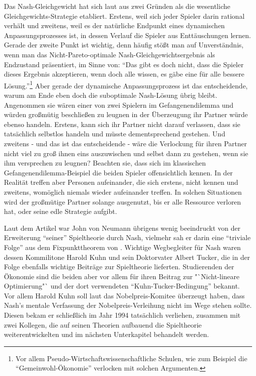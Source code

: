 Das Nash-Gleichgewicht hat sich laut \textcite[S. 61]{Holler2005} aus zwei Gründen als die wesentliche Gleichgewichts-Strategie etabliert. Erstens, weil sich jeder Spieler darin rational verhält und zweitens, weil es der natürliche Endpunkt eines dynamischen Anpassungsprozesses ist, in dessen Verlauf die Spieler aus Enttäuschungen lernen. Gerade der zweite Punkt ist wichtig, denn häufig stößt man auf Unverständnis, wenn man das Nicht-Pareto-optimale Nash-Gleichgewichtsergebnis als Endzustand präsentiert, im Sinne von: "`Das gibt es doch nicht, dass die Spieler dieses Ergebnis akzeptieren, wenn doch alle wissen, es gäbe eine für alle bessere Lösung."'\footnote{Vor allem Pseudo-Wirtschaftswissenschaftliche Schulen, wie zum Beispiel die "`Gemeinwohl-Ökonomie"' verlocken mit solchen Argumenten.} Aber gerade der dynamische Anpassungsprozess ist das entscheidende, warum am Ende eben doch die suboptimale Nash-Lösung übrig bleibt. Angenommen sie wären einer von zwei Spielern im Gefangenendilemma und würden großmütig beschließen zu leugnen in der Überzeugung ihr Partner würde ebenso handeln. Erstens, kann sich ihr Partner nicht darauf verlassen, dass sie tatsächlich selbstlos handeln und müsste dementsprechend gestehen. Und zweitens - und das ist das entscheidende - wäre die Verlockung für ihren Partner nicht viel zu groß ihnen eins auszuwischen und selbst dann zu gestehen, wenn sie ihm versprechen zu leugnen? Beachten sie, dass sich im klassischen Gefangenendilemma-Beispiel die beiden Spieler offensichtlich kennen. In der Realität treffen aber Personen aufeinander, die sich erstens, nicht kennen und zweitens, womöglich niemals wieder aufeinander treffen. In solchen Situationen wird der großmütige Partner solange ausgenutzt, bis er alle Ressource verloren hat, oder seine edle Strategie aufgibt.

Laut dem Artikel \textcite{Cassidy2015} war John von Neumann übrigens wenig beeindruckt von der Erweiterung "`seiner"' Spieltheorie durch Nash, vielmehr sah er darin eine "`triviale Folge"' aus dem Fixpunkttheorem von \textcite{Brouwer1912}. Wichtige Wegbegleiter für Nash waren dessen Kommilitone Harold Kuhn und sein Doktorvater Albert Tucker, die in der Folge ebenfalls wichtige Beiträge zur Spieltheorie lieferten. Studierenden der Ökonomie sind die beiden aber vor allem für ihren Beitrag zur "`Nicht-lineare Optimierung"` und der dort verwendeten "`Kuhn-Tucker-Bedingung"' \parencite{Kuhn1951} bekannt. Vor allem Harold Kuhn soll laut \textcite{Rubinstein2003} das Nobelpreis-Komitee überzeugt haben, dass Nash's mentale Verfassung der Nobelpreis-Verleihung nicht im Wege stehen sollte. Diesen bekam er schließlich im Jahr 1994 tatsächlich verliehen, zusammen mit zwei Kollegen, die auf seinen Theorien aufbauend die Spieltheorie weiterentwickelten und im nächsten Unterkapitel behandelt werden.


